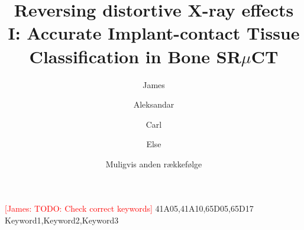 \documentclass[times,twocolumn,final]{elsarticle}
\newcommand{\james}[1]{\textcolor{red}{[James: #1]}}
\begin{document}

\begin{frontmatter}

\title{
  Reversing distortive X-ray effects I:
  Accurate Implant-contact Tissue Classification in Bone SR$\mu$CT
}%

\author[1]{James }
\author[3]{Aleksandar }
\author[1]{Carl }
\author[4]{Else }
\author{Muligvis anden rækkefølge}

\address[1]{University of Copenhagen, Department of Computer Science}
\address[2]{University of Copenhagen, Niels Bohr Institute}
\address[3]{Qtechnology A/S}
\address[4]{University of Southern Denmark}



\begin{abstract}
  
\end{abstract}

\begin{keyword}
  \james{TODO: Check correct keywords}
\MSC 41A05\sep 41A10\sep 65D05\sep 65D17
\KWD Keyword1\sep Keyword2\sep Keyword3
\end{keyword}

\end{frontmatter}











\end{document}
